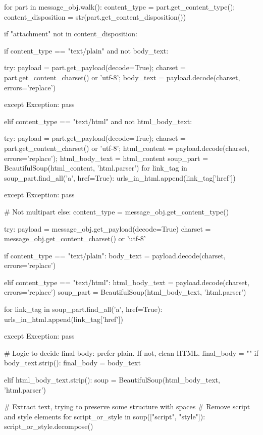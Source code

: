 \begin{ffcode}
    for part in message_obj.walk():
        content_type = part.get_content_type(); content_disposition = str(part.get_content_disposition())

        if "attachment" not in content_disposition:

            if content_type == "text/plain" and not body_text:

                try:
                    payload = part.get_payload(decode=True); charset = part.get_content_charset() or 'utf-8'; body_text = payload.decode(charset, errors='replace')

                except Exception: pass

            elif content_type == "text/html" and not html_body_text:

                try:
                    payload = part.get_payload(decode=True); charset = part.get_content_charset() or 'utf-8'; html_content = payload.decode(charset, errors='replace'); html_body_text = html_content
                    soup_part = BeautifulSoup(html_content, 'html.parser')
                    for link_tag in soup_part.find_all('a', href=True): urls_in_html.append(link_tag['href'])

                except Exception: pass

# Not multipart
else:
    content_type = message_obj.get_content_type()

    try:
        payload = message_obj.get_payload(decode=True)
        charset = message_obj.get_content_charset() or 'utf-8'

        if content_type == "text/plain":
            body_text = payload.decode(charset, errors='replace')

        elif content_type == "text/html":
            html_body_text = payload.decode(charset, errors='replace')
            soup_part = BeautifulSoup(html_body_text, 'html.parser')

            for link_tag in soup_part.find_all('a', href=True):
                urls_in_html.append(link_tag['href'])

    except Exception: pass

# Logic to decide final body: prefer plain. If not, clean HTML.
final_body = ""
if body_text.strip():
    final_body = body_text

elif html_body_text.strip():
    soup = BeautifulSoup(html_body_text, 'html.parser')

    # Extract text, trying to preserve some structure with spaces
    # Remove script and style elements
    for script_or_style in soup(["script", "style"]):
        script_or_style.decompose()


\end{ffcode}
